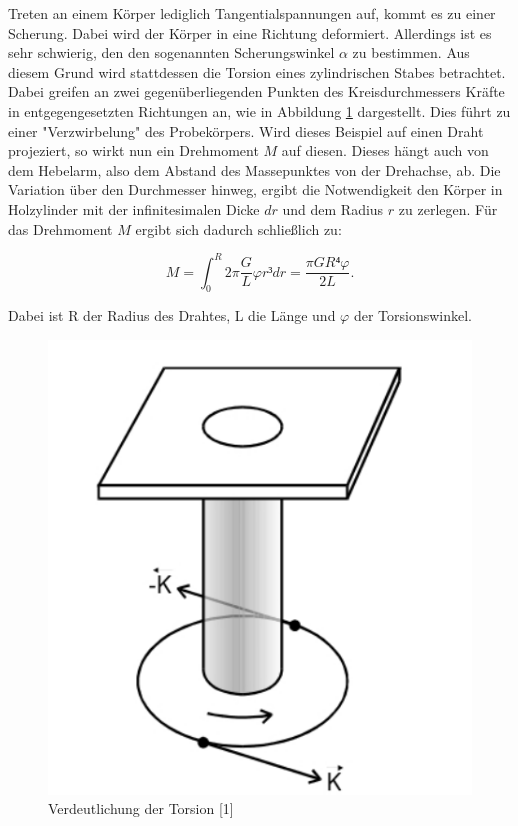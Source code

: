 Treten an einem Körper lediglich Tangentialspannungen auf, kommt es zu einer 
Scherung. Dabei wird der Körper in eine Richtung deformiert. Allerdings ist es 
sehr schwierig, den den sogenannten Scherungswinkel $\alpha$ zu bestimmen. 
Aus diesem Grund wird stattdessen die Torsion eines zylindrischen Stabes 
betrachtet. Dabei greifen an zwei gegenüberliegenden Punkten des Kreisdurchmessers
Kräfte in entgegengesetzten Richtungen an, wie in Abbildung \ref{fig:Torsion} dargestellt. 
Dies führt zu einer "Verzwirbelung" des
Probekörpers. Wird dieses Beispiel auf einen Draht projeziert, so wirkt nun
ein Drehmoment $M$ auf diesen. Dieses hängt auch von dem Hebelarm, also dem 
Abstand des Massepunktes von der Drehachse, ab. Die Variation über den 
Durchmesser hinweg, ergibt die Notwendigkeit den Körper in Holzylinder mit 
der infinitesimalen Dicke $dr$ und dem Radius $r$ zu zerlegen. 
Für das Drehmoment $M$ ergibt sich dadurch schließlich zu: 

\begin{equation*}
M = \int_0^R 2\pi \frac{G}{L} \varphi r³ dr = \frac{\pi G R⁴ \varphi}{2 L}.
\end{equation*}

Dabei ist R der Radius des Drahtes, L die Länge und $\varphi$ der Torsionswinkel. 

\begin{figure}
  \centering
  \includegraphics[scale=0.3]{content/Torsion.png}
  \caption{Verdeutlichung der Torsion [1]}
  \label{fig:Torsion}
\end{figure}

